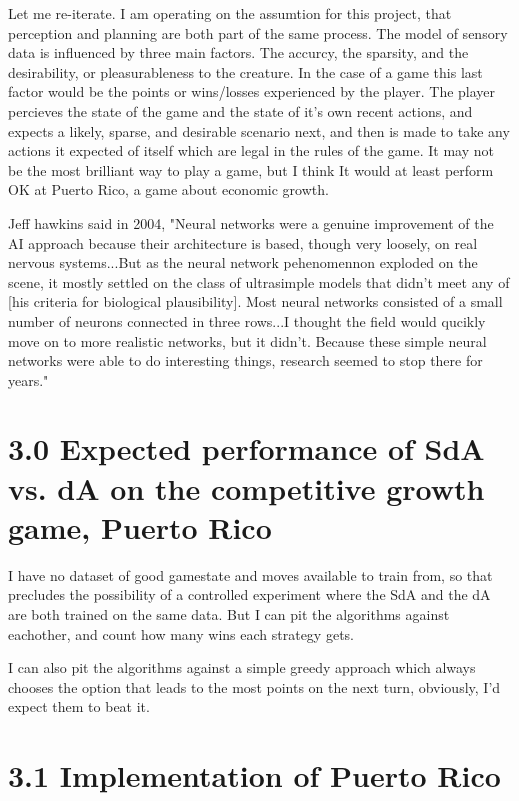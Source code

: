 \documentclass[11pt]{article}
\begin{document}
Let me re-iterate. I am operating on the assumtion for this project, that perception and planning are both part of the same process. The model of sensory data is influenced by three main factors. The accurcy, the sparsity, and the desirability, or pleasurableness to the creature. In the case of a game this last factor would be the points or wins/losses experienced by the player. The player percieves the state of the game and the state of it's own recent actions, and expects a likely, sparse, and desirable scenario next, and then is made to take any actions it expected of itself which are legal in the rules of the game. It may not be the most brilliant way to play a game, but I think It would at least perform OK at Puerto Rico, a game about economic growth.

Jeff hawkins said in 2004, "Neural networks were a genuine improvement of the AI approach because their architecture is based, though very loosely, on real nervous systems...But as the neural network pehenomennon exploded on the scene, it mostly settled on the class of ultrasimple models that didn't meet any of [his criteria for biological plausibility]. Most neural networks consisted of a small number of neurons connected in three rows...I thought the field would qucikly move on to more realistic networks, but it didn't. Because these simple neural networks were able to do interesting things, research seemed to stop there for years."

\section{3.0 Expected performance of SdA vs. dA on the competitive growth game, Puerto Rico}
\label{Expected performance of SdA vs. dA on the competitive growth game, Puerto Rico}

I have no dataset of good gamestate and moves available to train from, so that precludes the possibility of a controlled experiment where the SdA and the dA are both trained on the same data. But I can pit the algorithms against eachother, and count how many wins each strategy gets. 

I can also pit the algorithms against a simple greedy approach which always chooses the option that leads to the most points on the next turn, obviously, I'd expect them to beat it. 

\section{3.1 Implementation of Puerto Rico}
\label{Implementation of Puerto Rico}
\end{document}
